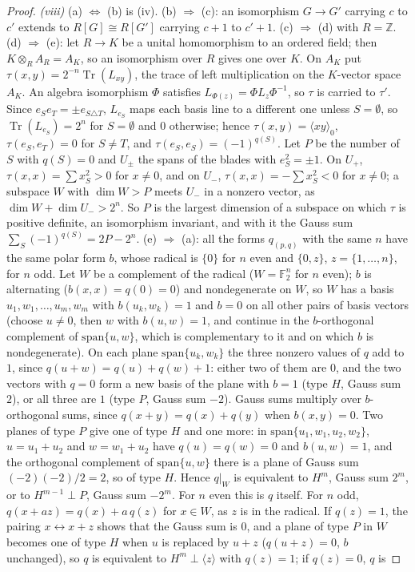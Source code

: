 \documentclass[11pt]{article}
\theoremstyle{definition}
\theoremstyle{plain}
\providecommand{\Tr}{}\renewcommand{\Tr}{\operatorname{Tr}}
\providecommand{\Z}{}\renewcommand{\Z}{\mathbb{Z}}
\begin{document}
\begin{proof}
\emph{(viii)} (a) $\Leftrightarrow$ (b) is (iv). (b) $\Rightarrow$ (c): an isomorphism $G \to G'$ carrying $c$ to $c'$ extends to $R[G] \cong R[G']$ carrying $c + 1$ to $c' + 1$. (c) $\Rightarrow$ (d) with $R = \Z$. (d) $\Rightarrow$ (e): let $R \to K$ be a unital homomorphism to an ordered field; then $K \otimes_{R} A_{R} = A_{K}$, so an isomorphism over $R$ gives one over $K$. On $A_{K}$ put $\tau(x, y) = 2^{-n}\Tr(L_{xy})$, the trace of left multiplication on the $K$-vector space $A_{K}$. An algebra isomorphism $\Phi$ satisfies $L_{\Phi(z)} = \Phi L_{z}\Phi^{-1}$, so $\tau$ is carried to $\tau'$. Since $e_{S}e_{T} = \pm e_{S \triangle T}$, $L_{e_{S}}$ maps each basis line to a different one unless $S = \emptyset$, so $\Tr(L_{e_{S}}) = 2^{n}$ for $S = \emptyset$ and $0$ otherwise; hence $\tau(x, y) = \langle xy\rangle_{0}$, $\tau(e_{S}, e_{T}) = 0$ for $S \ne T$, and $\tau(e_{S}, e_{S}) = (-1)^{q(S)}$. Let $P$ be the number of $S$ with $q(S) = 0$ and $U_{\pm}$ the spans of the blades with $e_{S}^{2} = \pm 1$. On $U_{+}$, $\tau(x, x) = \sum x_{S}^{2} > 0$ for $x \ne 0$, and on $U_{-}$, $\tau(x, x) = -\sum x_{S}^{2} < 0$ for $x \ne 0$; a subspace $W$ with $\dim W > P$ meets $U_{-}$ in a nonzero vector, as $\dim W + \dim U_{-} > 2^{n}$. So $P$ is the largest dimension of a subspace on which $\tau$ is positive definite, an isomorphism invariant, and with it the Gauss sum $\sum_{S}(-1)^{q(S)} = 2P - 2^{n}$. (e) $\Rightarrow$ (a): all the forms $q_{(p,q)}$ with the same $n$ have the same polar form $b$, whose radical is $\{0\}$ for $n$ even and $\{0, z\}$, $z = \{1, \dots, n\}$, for $n$ odd. Let $W$ be a complement of the radical ($W = \mathbb{F}_{2}^{n}$ for $n$ even); $b$ is alternating ($b(x, x) = q(0) = 0$) and nondegenerate on $W$, so $W$ has a basis $u_{1}, w_{1}, \dots, u_{m}, w_{m}$ with $b(u_{k}, w_{k}) = 1$ and $b = 0$ on all other pairs of basis vectors (choose $u \ne 0$, then $w$ with $b(u, w) = 1$, and continue in the $b$-orthogonal complement of $\mathrm{span}\{u, w\}$, which is complementary to it and on which $b$ is nondegenerate). On each plane $\mathrm{span}\{u_{k}, w_{k}\}$ the three nonzero values of $q$ add to $1$, since $q(u + w) = q(u) + q(w) + 1$: either two of them are $0$, and the two vectors with $q = 0$ form a new basis of the plane with $b = 1$ (type $H$, Gauss sum $2$), or all three are $1$ (type $P$, Gauss sum $-2$). Gauss sums multiply over $b$-orthogonal sums, since $q(x + y) = q(x) + q(y)$ when $b(x, y) = 0$. Two planes of type $P$ give one of type $H$ and one more: in $\mathrm{span}\{u_{1}, w_{1}, u_{2}, w_{2}\}$, $u = u_{1} + u_{2}$ and $w = w_{1} + u_{2}$ have $q(u) = q(w) = 0$ and $b(u, w) = 1$, and the orthogonal complement of $\mathrm{span}\{u, w\}$ there is a plane of Gauss sum $(-2)(-2)/2 = 2$, so of type $H$. Hence $q|_{W}$ is equivalent to $H^{m}$, Gauss sum $2^{m}$, or to $H^{m-1} \perp P$, Gauss sum $-2^{m}$. For $n$ even this is $q$ itself. For $n$ odd, $q(x + az) = q(x) + a\,q(z)$ for $x \in W$, as $z$ is in the radical. If $q(z) = 1$, the pairing $x \leftrightarrow x + z$ shows that the Gauss sum is $0$, and a plane of type $P$ in $W$ becomes one of type $H$ when $u$ is replaced by $u + z$ ($q(u + z) = 0$, $b$ unchanged), so $q$ is equivalent to $H^{m} \perp \langle z\rangle$ with $q(z) = 1$; if $q(z) = 0$, $q$ is 
\end{proof}
\end{document}
